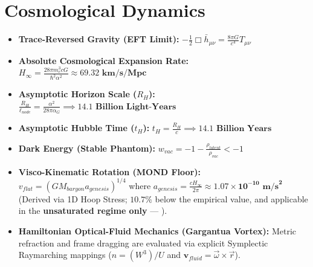 \section{Cosmological Dynamics}
\begin{itemize}
    \item \textbf{Trace-Reversed Gravity (EFT Limit):} $-\frac{1}{2} \Box \bar{h}_{\mu\nu} = \frac{8\pi G}{c^4} T_{\mu\nu}$
    \item \textbf{Absolute Cosmological Expansion Rate:} $H_\infty = \frac{28\pi m_e^3 c G}{\hbar^2 \alpha^2} \approx \mathbf{69.32 \text{ km/s/Mpc}}$
    \item \textbf{Asymptotic Horizon Scale ($R_H$):} $\frac{R_H}{\ell_{node}} = \frac{\alpha^2}{28\pi\alpha_G} \implies \mathbf{14.1 \text{ Billion Light-Years}}$
    \item \textbf{Asymptotic Hubble Time ($t_H$):} $t_H = \frac{R_H}{c} \implies \mathbf{14.1 \text{ Billion Years}}$
    \item \textbf{Dark Energy (Stable Phantom):} $w_{vac} = -1 - \frac{\rho_{latent}}{\rho_{vac}} < -1$
    \item \textbf{Visco-Kinematic Rotation (MOND Floor):} $v_{flat} = (GM_{baryon} a_{genesis})^{1/4}$ where $a_{genesis} = \frac{c H_\infty}{2\pi} \approx \mathbf{1.07 \times 10^{-10} \text{ m/s}^2}$ (Derived via 1D Hoop Stress; $10.7\%$ below the empirical value, and applicable in the \textbf{unsaturated regime only} --- ).
    \item \textbf{Hamiltonian Optical-Fluid Mechanics (Gargantua Vortex):} Metric refraction and frame dragging are evaluated via explicit Symplectic Raymarching mappings ($n = (W^3) / U$ and $\mathbf{v}_{fluid} = \vec{\omega} \times \vec{r}$). 
\end{itemize}

